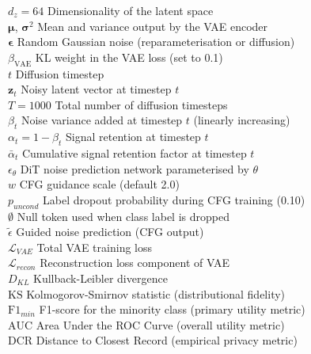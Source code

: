 \noindent $d_z = 64$ \dotfill Dimensionality of the latent space \\[4pt]
\noindent $\boldsymbol{\mu}$, $\boldsymbol{\sigma}^2$ \dotfill Mean and variance output by the VAE encoder \\[4pt]
\noindent $\boldsymbol{\epsilon}$ \dotfill Random Gaussian noise (reparameterisation or diffusion) \\[4pt]
\noindent $\beta_{\text{VAE}}$ \dotfill KL weight in the VAE loss (set to 0.1) \\[4pt]
\noindent $t$ \dotfill Diffusion timestep \\[4pt]
\noindent $\mathbf{z}_t$ \dotfill Noisy latent vector at timestep $t$ \\[4pt]
\noindent $T = 1000$ \dotfill Total number of diffusion timesteps \\[4pt]
\noindent $\beta_t$ \dotfill Noise variance added at timestep $t$ (linearly increasing) \\[4pt]
\noindent $\alpha_t = 1 - \beta_t$ \dotfill Signal retention at timestep $t$ \\[4pt]
\noindent $\bar{\alpha}_t$ \dotfill Cumulative signal retention factor at timestep $t$ \\[4pt]
\noindent $\epsilon_\theta$ \dotfill DiT noise prediction network parameterised by $\theta$ \\[4pt]
\noindent $w$ \dotfill CFG guidance scale (default 2.0) \\[4pt]
\noindent $p_{uncond}$ \dotfill Label dropout probability during CFG training (0.10) \\[4pt]
\noindent $\emptyset$ \dotfill Null token used when class label is dropped \\[4pt]
\noindent $\tilde{\epsilon}$ \dotfill Guided noise prediction (CFG output) \\[4pt]
\noindent $\mathcal{L}_{VAE}$ \dotfill Total VAE training loss \\[4pt]
\noindent $\mathcal{L}_{recon}$ \dotfill Reconstruction loss component of VAE \\[4pt]
\noindent $D_{KL}$ \dotfill Kullback-Leibler divergence \\[4pt]
\noindent $\text{KS}$ \dotfill Kolmogorov-Smirnov statistic (distributional fidelity) \\[4pt]
\noindent $\text{F1}_{min}$ \dotfill F1-score for the minority class (primary utility metric) \\[4pt]
\noindent $\text{AUC}$ \dotfill Area Under the ROC Curve (overall utility metric) \\[4pt]
\noindent $\text{DCR}$ \dotfill Distance to Closest Record (empirical privacy metric)
